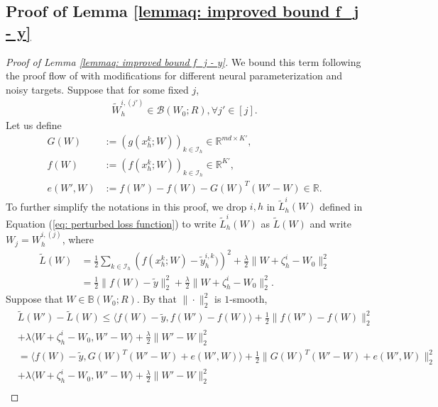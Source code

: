 \documentclass{article} \usepackage{iclr2023/iclr2023_conference,times}
\begin{document}
\subsection{Proof of Lemma \ref{lemmaq: improved bound f_j - y}} 
\label{subsection: proof of lemma f_j - y}
\begin{proof}[Proof of Lemma \ref{lemmaq: improved bound f_j - y}]
We bound this term following the proof flow of \cite[Lemma~C.3]{zhou2020neural} with modifications for different neural parameterization and noisy targets. Suppose that for some fixed $j$, 
\begin{align}
    \tilde{W}_h^{i,(j')} \in \mathcal{B}(W_0; R), \forall j' \in [j].
    \label{eq: induction condition that tilde W i j' in the ball}
\end{align}
Let us define 
\begin{align*}
G(W) &:= \left( g(x^k_h; W) \right)_{k \in \mathcal{I}_h} \in \mathbb{R}^{md \times K' }, \\ 
f(W) &:= \left( f(x^k_h; W)\right)_{k \in \mathcal{I}_h} \in \mathbb{R}^{K'}, \\ 
    e(W',W) &:= f(W') - f(W) - G(W)^T (W' - W) \in \mathbb{R}.
\end{align*}
To further simplify the notations in this proof, we drop $i,h$ in $\tilde{L}_h^i(W)$ defined in Equation (\ref{eq: perturbed loss function}) to write $\tilde{L}_h^i(W)$ as $\tilde{L}(W)$ and write $W_j = W_h^{i, (j)}$, where
\begin{align*}
    \tilde{L}(W) &= \frac{1}{2}\sum_{k \in \mathcal{I}_h} \left( f(x^k_h; W) - \tilde{y}^{i,k}_h ) \right)^2 + \frac{\lambda}{2} \| W + \zeta^i_h - W_0 \|_2^2 \\ 
    &= \frac{1}{2} \| f(W) - \tilde{y} \|_2^2 +   \frac{\lambda}{2} \| W + \zeta^i_h - W_0 \|_2^2. 
\end{align*}
Suppose that $W \in \mathbb{B}(W_0; R)$. By that $\| \cdot \|_2^2$ is $1$-smooth, 
\begin{align}
    &\tilde{L}(W') - \tilde{L}(W) \leq \langle f(W) - \tilde{y}, f(W') - f(W) \rangle + \frac{1}{2} \| f(W') - f(W) \|_2^2 \nonumber \\
    &+ \lambda \langle W + \zeta^i_h - W_0, W' - W \rangle + \frac{\lambda}{2} \| W' - W\|_2^2 \nonumber \\
    &= \langle f(W) - \tilde{y}, G(W)^T (W' - W) + e(W',W) \rangle + \frac{1}{2} \| G(W)^T (W' - W) + e(W',W) \|_2^2 \nonumber \\
    &+ \lambda \langle W + \zeta^i_h - W_0, W' - W \rangle + \frac{\lambda}{2} \| W' - W\|_2^2 \nonumber \\ 

\end{align}
\end{proof}
\end{document}
